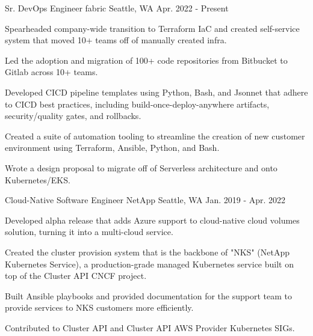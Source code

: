 


\begin{cventries}

\cventry
{Sr. DevOps Engineer} %
{fabric} %
{Seattle, WA} %
{Apr. 2022 - Present} %
{ %
\begin{cvitems}
\item {Spearheaded company-wide transition to Terraform IaC and created self-service system that moved 10+ teams off of manually created infra.}
\item {Led the adoption and migration of 100+ code repositories from Bitbucket to Gitlab across 10+ teams.}
\item {Developed CICD pipeline templates using Python, Bash, and Jsonnet that adhere to CICD best practices, including build-once-deploy-anywhere artifacts, security/quality gates, and rollbacks.}
\item {Created a suite of automation tooling to streamline the creation of new customer environment using Terraform, Ansible, Python, and Bash.}
\item {Wrote a design proposal to migrate off of Serverless architecture and onto Kubernetes/EKS.}
\end{cvitems}
}


\cventry
{Cloud-Native Software Engineer} %
{NetApp} %
{Seattle, WA} %
{Jan. 2019 - Apr. 2022} %
{ %
\begin{cvitems}
\item {Developed alpha release that adds Azure support to cloud-native cloud volumes solution, turning it into a multi-cloud service.}
\item {Created the cluster provision system that is the backbone of "NKS" (NetApp Kubernetes Service), a production-grade managed Kubernetes service built on top of the Cluster API CNCF project.}
\item {Built Ansible playbooks and provided documentation for the support team to provide services to NKS customers more efficiently.}
\item {Contributed to Cluster API and Cluster API AWS Provider Kubernetes SIGs.}
\end{cvitems}   
}



\end{cventries}
